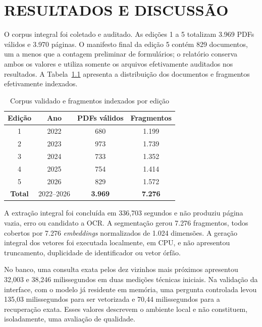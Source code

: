 \chapter{RESULTADOS E DISCUSSÃO}

O corpus integral foi coletado e auditado. As edições 1 a 5 totalizam 3.969 PDFs válidos e 3.970 páginas. O manifesto final da edição 5 contém 829 documentos, um a menos que a contagem preliminar de formulários; o relatório conserva ambos os valores e utiliza somente os arquivos efetivamente auditados nos resultados. A Tabela~\ref{tab:mapeamento} apresenta a distribuição dos documentos e fragmentos efetivamente indexados.

\begin{table}[htbp]
\centering
\caption{Corpus validado e fragmentos indexados por edição}
\label{tab:mapeamento}
\renewcommand{\arraystretch}{1.2}
\begin{tabular*}{\textwidth}{@{\extracolsep{\fill}}cccc}
\toprule
\textbf{Edição} & \textbf{Ano} & \textbf{PDFs válidos} & \textbf{Fragmentos} \\ \midrule
1 & 2022 & 680 & 1.199 \\
2 & 2023 & 973 & 1.739 \\
3 & 2024 & 733 & 1.352 \\
4 & 2025 & 754 & 1.414 \\
5 & 2026 & 829 & 1.572 \\
\textbf{Total} & 2022--2026 & \textbf{3.969} & \textbf{7.276} \\ \bottomrule
\end{tabular*}
\end{table}

A extração integral foi concluída em 336,703 segundos e não produziu página vazia, erro ou candidato a OCR. A segmentação gerou 7.276 fragmentos, todos cobertos por 7.276 \textit{embeddings} normalizados de 1.024 dimensões. A geração integral dos vetores foi executada localmente, em CPU, e não apresentou truncamento, duplicidade de identificador ou vetor órfão.

No banco, uma consulta exata pelos dez vizinhos mais próximos apresentou 32,003 e 38,246 milissegundos em duas medições técnicas iniciais. Na validação da interface, com o modelo já residente em memória, uma pergunta controlada levou 135,03 milissegundos para ser vetorizada e 70,44 milissegundos para a recuperação exata. Esses valores descrevem o ambiente local e não constituem, isoladamente, uma avaliação de qualidade.

